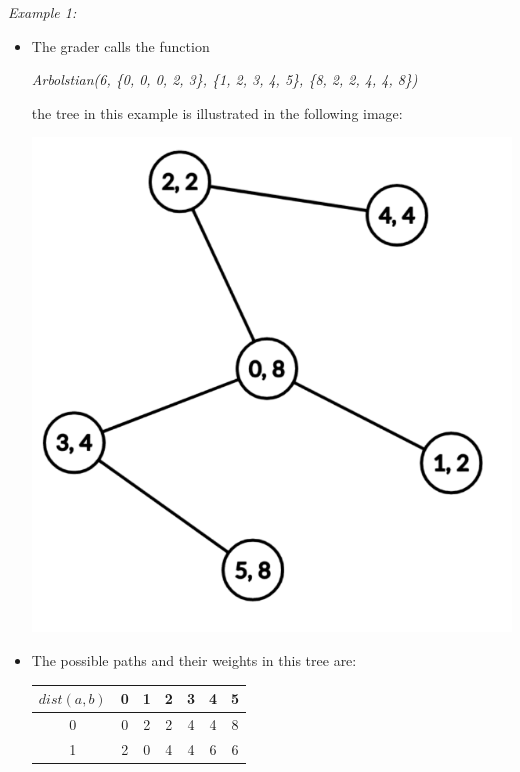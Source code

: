 \documentclass[12pt]{scrartcl}
\begin{document}
        {\itshape Example 1:}
        \begin{itemize}
            \item The grader calls the function 
            \begin{center}
                \textit{Arbolstian(6, \{0, 0, 0, 2, 3\}, \{1, 2, 3, 4, 5\}, \{8, 2, 2, 4, 4, 8\})}
            \end{center}
            the tree in this example is illustrated in the following image:
            
            \begin{center}
                \includegraphics[scale=0.25]{ej1.png}
            \end{center}
            \item The possible paths and their weights in this tree are:
            \begin{center}
                \begin{tabular}{|c||c|c|c|c|c|c|}
                    \hline
                     $dist(a, b)$ & 0 & 1 & 2 & 3 & 4 & 5 \\
                     \hline
                     \hline
                     0 & 0 & 2 & 2 & 4 & 4 & 8 \\
                     \hline
                     1 & 2 & 0 & 4 & 4 & 6 & 6 \\

\end{tabular}
\end{center}
\end{itemize}
\end{document}
